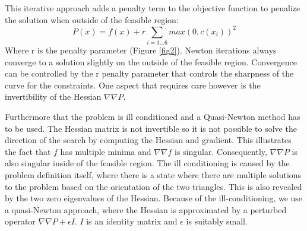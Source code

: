 \documentclass[times,12pt]{article}
\begin{document}
This iterative approach adds a penalty term to the objective function to penalize the solution when outside of the feasible region: 
\begin{equation}\label{eq:penalty}
P(x)=f(x)+r\sum_{i=1...6}max(0,c(x_{i}))^{2}
\end{equation}
Where r is the penalty parameter (Figure \ref{fig2}). Newton iterations always converge to a solution slightly on the outside of the feasible region. Convergence can be controlled by the r penalty parameter that controls the sharpness of the curve for the constraints. One aspect that requires care however is the invertibility of the Hessian $\nabla\nabla P$. 

Furthermore that the problem is ill conditioned and a Quasi-Newton method has to be used. The Hessian matrix is not invertible so it is not possible to solve the direction of the search by computing the Hessian and gradient. This illustrates the fact that $f$ has multiple minima and $\nabla\nabla f$ is singular. Consequently, $\nabla\nabla P$ is also singular inside of the feasible region. The ill conditioning is caused by the problem definition itself, where there is a state where there are multiple solutions to the problem based on the orientation of the two triangles. This is also revealed by the two zero eigenvalues of the Hessian. Because of the ill-conditioning, we use a quasi-Newton approach, where the Hessian is approximated by a perturbed operator $\nabla\nabla P + \epsilon I$. $I$ is an identity matrix and $\epsilon$ is suitably small. 
\end{document}
